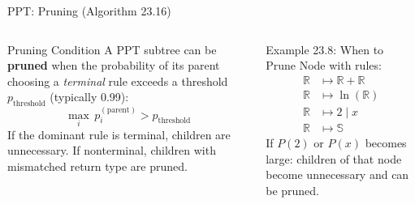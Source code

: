 \documentclass[aspectratio=169,10pt]{beamer}
\begin{document}
\begin{frame}{PPT: Pruning (Algorithm 23.16)}
  \begin{columns}[T]
    \begin{block}{Pruning Condition}
      A PPT subtree can be \textbf{pruned} when the probability of its
      parent choosing a \emph{terminal} rule exceeds a threshold
      $p_{\text{threshold}}$ (typically 0.99):
      \[
        \max_i \, p_i^{(\text{parent})} > p_{\text{threshold}}
      \]
      If the dominant rule is terminal, children are unnecessary.
      If nonterminal, children with mismatched return type are pruned.
    \end{block}
    \begin{exampleblock}{Example 23.8: When to Prune}
      Node with rules:
      \begin{align*}
        \mathbb{R} &\mapsto \mathbb{R}+\mathbb{R} \\
        \mathbb{R} &\mapsto \ln(\mathbb{R}) \\
        \mathbb{R} &\mapsto 2 \mid x \\
        \mathbb{R} &\mapsto \mathbb{S}
      \end{align*}
      If $P(2)$ or $P(x)$ becomes large: children of that node become unnecessary and can be pruned.
    \end{exampleblock}
  \end{columns}
\end{frame}
\end{document}
